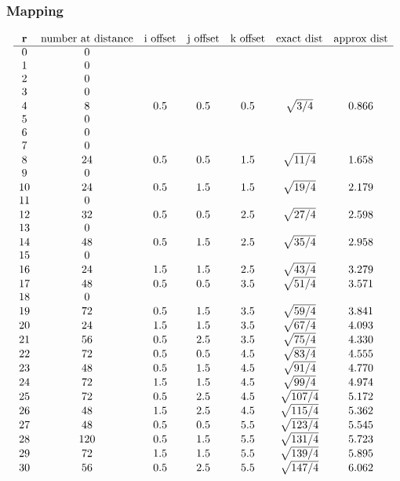 \subsubsection{Mapping}
\begin{equation}
\left.\begin{array}{ccccccc}
\bf{r} & \text{number at distance} & \text{i offset} & \text{j offset} & \text{k offset} & \text{exact dist} & \text{approx dist} \\
\hline
0 & 0 & & & & & \\
1 & 0 & & & & & \\
2 & 0 & & & & & \\
3 & 0 & & & & & \\
4 & 8 & 0.5 & 0.5 & 0.5 & \sqrt{3/4} & 0.866 \\
5 & 0 & & &  & &\\
6 & 0 & & & & & \\
7 & 0 & & & & & \\
8 & 24 & 0.5 & 0.5 & 1.5 & \sqrt{11/4} & 1.658\\
9 & 0 & & & & & \\
10 & 24 & 0.5 & 1.5 & 1.5 & \sqrt{19/4} & 2.179 \\
11 & 0 & & & & & \\
12 & 32 & 0.5 & 0.5 & 2.5 & \sqrt{27/4} & 2.598 \\
13 & 0 & & & & & \\
14 & 48 & 0.5 & 1.5 & 2.5 & \sqrt{35/4} & 2.958 \\
15 & 0 & & & \\
16 & 24 & 1.5 & 1.5 & 2.5 & \sqrt{43/4} & 3.279 \\
17 & 48 & 0.5 & 0.5 & 3.5 & \sqrt{51/4} & 3.571 \\
18 & 0 & & & & & \\
19 & 72 & 0.5 & 1.5 & 3.5 & \sqrt{59/4} & 3.841 \\
20 & 24 & 1.5 & 1.5 & 3.5 & \sqrt{67/4} & 4.093 \\
21 & 56 & 0.5 & 2.5 & 3.5 & \sqrt{75/4} & 4.330 \\
22 & 72 & 0.5 & 0.5 & 4.5 & \sqrt{83/4} & 4.555 \\
23 & 48 & 0.5 & 1.5 & 4.5 & \sqrt{91/4} & 4.770 \\
24 & 72 & 1.5 & 1.5 & 4.5 & \sqrt{99/4} & 4.974 \\
25 & 72 & 0.5 & 2.5 & 4.5 & \sqrt{107/4} & 5.172 \\
26 & 48 & 1.5 & 2.5 & 4.5 & \sqrt{115/4} & 5.362 \\
27 & 48 & 0.5 & 0.5 & 5.5 & \sqrt{123/4} & 5.545 \\
28 & 120 & 0.5 & 1.5 & 5.5 & \sqrt{131/4} & 5.723 \\
29 & 72 & 1.5 & 1.5 & 5.5 & \sqrt{139/4} & 5.895 \\
30 & 56 & 0.5 & 2.5 & 5.5 & \sqrt{147/4} & 6.062 \\
\end{array}\right.
\end{equation}

